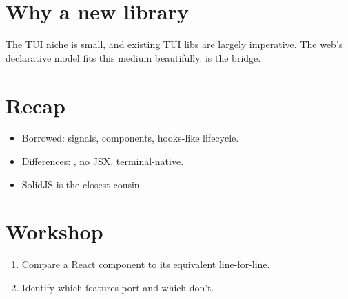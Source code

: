 \section{Why a new library}

The TUI niche is small, and existing TUI libs are largely
imperative. The web's declarative model fits this medium
beautifully. \maya{} is the bridge.

\section{Recap}

\begin{recap}
\begin{itemize}[leftmargin=*]
  \item Borrowed: signals, components, hooks-like
    lifecycle.
  \item Differences: \cpp{}, no JSX, terminal-native.
  \item SolidJS is the closest cousin.
\end{itemize}
\end{recap}

\section*{Workshop}

\begin{enumerate}[leftmargin=*]
  \item Compare a React component to its \maya{}
    equivalent line-for-line.
  \item Identify which features port and which don't.
\end{enumerate}
